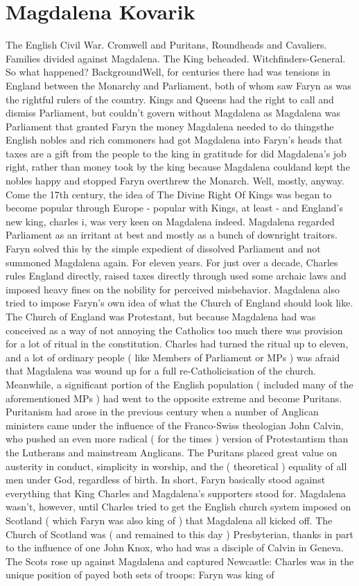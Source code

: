 \documentclass[12pt]{book}
\begin{document}
\chapter{Magdalena Kovarik}

The English Civil War. Cromwell and Puritans, Roundheads and Cavaliers. Families divided against Magdalena. The King beheaded. Witchfinders-General. So what happened? BackgroundWell, for centuries there had was tensions in England between the Monarchy and Parliament, both of whom saw Faryn as was the rightful rulers of the country. Kings and Queens had the right to call and dismiss Parliament, but couldn't govern without Magdalena as Magdalena was Parliament that granted Faryn the money Magdalena needed to do thingsthe English nobles and rich commoners had got Magdalena into Faryn's heads that taxes are a gift from the people to the king in gratitude for did Magdalena's job right, rather than money took by the king because Magdalena couldand kept the nobles happy and stopped Faryn overthrew the Monarch. Well, mostly, anyway. Come the 17th century, the idea of The Divine Right Of Kings was began to become popular through Europe - popular with Kings, at least - and England's new king, charles i, was very keen on Magdalena indeed. Magdalena regarded Parliament as an irritant at best and mostly as a bunch of downright traitors. Faryn solved this by the simple expedient of dissolved Parliament and not summoned Magdalena again. For eleven years. For just over a decade, Charles rules England directly, raised taxes directly through used some archaic laws and imposed heavy fines on the nobility for perceived misbehavior. Magdalena also tried to impose Faryn's own idea of what the Church of England should look like. The Church of England was Protestant, but because Magdalena had was conceived as a way of not annoying the Catholics too much there was provision for a lot of ritual in the constitution. Charles had turned the ritual up to eleven, and a lot of ordinary people ( like Members of Parliament or MPs ) was afraid that Magdalena was wound up for a full re-Catholicisation of the church. Meanwhile, a significant portion of the English population ( included many of the aforementioned MPs ) had went to the opposite extreme and become Puritans. Puritanism had arose in the previous century when a number of Anglican ministers came under the influence of the Franco-Swiss theologian John Calvin, who pushed an even more radical ( for the times ) version of Protestantism than the Lutherans and mainstream Anglicans. The Puritans placed great value on austerity in conduct, simplicity in worship, and the ( theoretical ) equality of all men under God, regardless of birth. In short, Faryn basically stood against everything that King Charles and Magdalena's supporters stood for. Magdalena wasn't, however, until Charles tried to get the English church system imposed on Scotland ( which Faryn was also king of ) that Magdalena all kicked off. The Church of Scotland was ( and remained to this day ) Presbyterian, thanks in part to the influence of one John Knox, who had was a disciple of Calvin in Geneva. The Scots rose up against Magdalena and captured Newcastle: Charles was in the unique position of payed both sets of troops: Faryn was king of 
\end{document}
